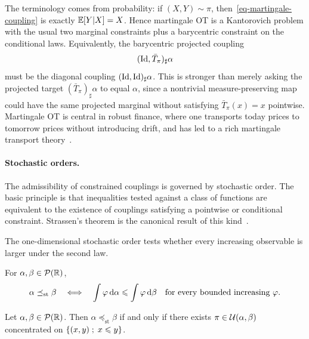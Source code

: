 The terminology comes from probability: if $(X,Y)\sim\pi$, then~\eqref{eq-martingale-coupling} is exactly $\mathbb{E}[Y|X]=X$. Hence martingale OT is a Kantorovich problem with the usual two marginal constraints plus a barycentric constraint on the conditional laws. Equivalently, the barycentric projected coupling
\[
	(\mathrm{Id},\bar T_\pi)_\sharp\alpha
\]
must be the diagonal coupling $(\mathrm{Id},\mathrm{Id})_\sharp\alpha$. This is stronger than merely asking the projected target $(\bar T_\pi)_\sharp\alpha$ to equal $\alpha$, since a nontrivial measure-preserving map could have the same projected marginal without satisfying $\bar T_\pi(x)=x$ pointwise. Martingale OT is central in robust finance, where one transports today prices to tomorrow prices without introducing drift, and has led to a rich martingale transport theory~\cite{beiglbock2013model,GalichonMartingale,dolinsky2014martingale,guo2017computational}.

\paragraph{Stochastic orders.}
The admissibility of constrained couplings is governed by stochastic order. The basic principle is that inequalities tested against a class of functions are equivalent to the existence of couplings satisfying a pointwise or conditional constraint. Strassen's theorem is the canonical result of this kind~\cite{Strassen1965}.

The one-dimensional stochastic order tests whether every increasing observable is larger under the second law.
\begin{defn}\label{def-classical-stochastic-order}
For $\alpha,\beta\in\mathcal{P}(\mathbb{R})$,
\[
\alpha\preceq_{\mathrm{st}}\beta
\quad\Longleftrightarrow\quad
\int\varphi\,\mathrm{d}\alpha\leqslant\int\varphi\,\mathrm{d}\beta
\quad\text{for every bounded increasing }\varphi.
\]
\end{defn}

\begin{prop}\label{prop-strassen-stochastic-order}
	Let $\alpha,\beta\in\mathcal{P}(\mathbb{R})$. Then $\alpha\preceq_{\mathrm{st}}\beta$ if and only if there exists $\pi\in\mathcal{U}(\alpha,\beta)$ concentrated on $\left\{ (x,y) \;;\; x\leqslant y \right\}$.
\end{prop}

